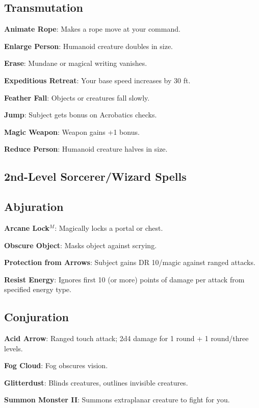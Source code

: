 \subsection{Transmutation}


\textbf{Animate Rope}: Makes a rope move at your command.

\textbf{Enlarge Person}: Humanoid creature doubles in size.

\textbf{Erase}: Mundane or magical writing vanishes.

\textbf{Expeditious Retreat}: Your base speed increases by 30 ft.

\textbf{Feather Fall}: Objects or creatures fall slowly.

\textbf{Jump}: Subject gets bonus on Acrobatics checks.

\textbf{Magic Weapon}: Weapon gains +1 bonus.

\textbf{Reduce Person}: Humanoid creature halves in size.

\subsection{2nd-Level Sorcerer/Wizard Spells}


\subsection{Abjuration}


\textbf{Arcane Lock}\(^{M}\): Magically locks a portal or chest.

\textbf{Obscure Object}: Masks object against scrying.

\textbf{Protection from Arrows}: Subject gains DR 10/magic against ranged attacks.

\textbf{Resist Energy}: Ignores first 10 (or more) points of damage per attack from specified energy type.

\subsection{Conjuration}


\textbf{Acid Arrow}: Ranged touch attack; 2d4 damage for 1 round + 1 round/three levels.

\textbf{Fog Cloud}: Fog obscures vision.

\textbf{Glitterdust}: Blinds creatures, outlines invisible creatures.

\textbf{Summon Monster II}: Summons extraplanar creature to fight for you.

